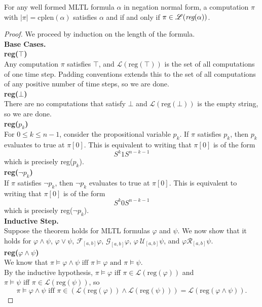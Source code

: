 \documentclass[runningheads]{llncs}
\begin{document}
 \begin{theorem}
 For any well formed MLTL formula $\alpha$ in negation normal form, a computation $\pi$ with $|\pi| = \text{cplen}(\alpha)$ satisfies $\alpha$ and  if and only if $\pi \in \mathscr{L}(\emph{reg}(\alpha))$.
 \end{theorem}
 \begin{proof}
 We proceed by induction on the length of the formula.\\
 
 \noindent \textbf{Base Cases.}\\
 \noindent\textbf{reg($\top$)}\\
 Any computation $\pi$ satisfies $\top$, and $\mathscr{L}(\text{reg}(\top))$ is the set of all computations of one time step. Padding conventions extends this to the set of all computations of any positive number of time steps, so we are done.\\
 
 \noindent\textbf{reg($\bot$)}\\
 There are no computations that satisfy $\bot$ and $\mathscr{L}(\text{reg}(\bot))$ is the empty string, so we are done.\\
 
 \noindent\textbf{reg($p_k$)}\\
 For $0\leq k \leq n-1$, consider the propositional variable $p_k$. If $\pi$ satisfies $p_k$, then $p_k$ evaluates to true at $\pi[0]$. This is equivalent to writing that $\pi[0]$ is of the form 
 $$S^{k} 1 S^{n-k-1}$$
 which is precisely reg($p_k$).\\
 
 \noindent\textbf{reg($\neg p_k$)}\\
 If $\pi$ satisfies $\neg p_k$, then $\neg p_k$ evaluates to true at $\pi[0]$. This is equivalent to writing that $\pi[0]$ is of the form 
 $$S^{k} 0 S^{n-k-1}$$
 which is precisely reg($\neg p_k$).\\
 
 \noindent\textbf{Inductive Step.}\\
 Suppose the theorem holds for MLTL formulas $\varphi$ and $\psi$. We now show that it holds for $\varphi \land \psi$, $\varphi \lor \psi$, $\mathcal{F}_{[a,b]} \varphi$, $\mathcal{G}_{[a,b]} \varphi$, $\varphi \ \mathcal{U}_{[a,b]} \psi$, and $\varphi \mathcal{R}_{[a,b]} \psi$.\\
 
 \noindent \textbf{reg($\varphi \land \psi$)}\\
 We know that $\pi \vDash \varphi \land \psi \text{ iff } \pi \vDash \varphi \text{ and } \pi \vDash \psi$.\\
 By the inductive hypothesis, $\pi \vDash \varphi$ iff $\pi \in \mathscr{L}(\text{reg}(\varphi))$ and 
 \\$\pi \vDash \psi$ iff $\pi \in \mathscr{L}(\text{reg}(\psi))$, so
 $$\pi \vDash \varphi \land \psi \text{ iff } \pi \in (\mathscr{L}(\text{reg}(\varphi)) \land \mathscr{L}(\text{reg}(\psi))) = \mathscr{L}(\text{reg}(\varphi \land \psi)).$$
 

\end{proof}
\end{document}
